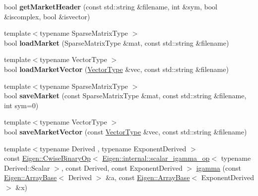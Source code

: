 \begin{DoxyCompactItemize}
\mbox{\label{namespace_eigen_a05ffc60521f5447623d7709a1419d7ac}} 
bool {\bfseries get\+Market\+Header} (const std\+::string \&filename, int \&sym, bool \&iscomplex, bool \&isvector)
\item 
\mbox{\label{namespace_eigen_a35610696b22ae58bdd51d96468956455}} 
{\footnotesize template$<$typename Sparse\+Matrix\+Type $>$ }\\bool {\bfseries load\+Market} (Sparse\+Matrix\+Type \&mat, const std\+::string \&filename)
\item 
\mbox{\label{namespace_eigen_a0b97a7af6c8af0fa0455723203b24853}} 
{\footnotesize template$<$typename Vector\+Type $>$ }\\bool {\bfseries load\+Market\+Vector} (\hyperlink{struct_vector_type}{Vector\+Type} \&vec, const std\+::string \&filename)
\item 
\mbox{\label{namespace_eigen_a33d673f7e2dfee413dec4395a6a40f46}} 
{\footnotesize template$<$typename Sparse\+Matrix\+Type $>$ }\\bool {\bfseries save\+Market} (const Sparse\+Matrix\+Type \&mat, const std\+::string \&filename, int sym=0)
\item 
\mbox{\label{namespace_eigen_a43fb1aaef616814a2c030a7986ed0afd}} 
{\footnotesize template$<$typename Vector\+Type $>$ }\\bool {\bfseries save\+Market\+Vector} (const \hyperlink{struct_vector_type}{Vector\+Type} \&vec, const std\+::string \&filename)
\item 
{\footnotesize template$<$typename Derived , typename Exponent\+Derived $>$ }\\const \hyperlink{group___core___module_class_eigen_1_1_cwise_binary_op}{Eigen\+::\+Cwise\+Binary\+Op}$<$ \hyperlink{struct_eigen_1_1internal_1_1scalar__igamma__op}{Eigen\+::internal\+::scalar\+\_\+igamma\+\_\+op}$<$ typename Derived\+::\+Scalar $>$, const Derived, const Exponent\+Derived $>$ \hyperlink{namespace_eigen_af5aa651137636b1cdbd27de1cfe91148}{igamma} (const \hyperlink{group___core___module_class_eigen_1_1_array_base}{Eigen\+::\+Array\+Base}$<$ Derived $>$ \&a, const \hyperlink{group___core___module_class_eigen_1_1_array_base}{Eigen\+::\+Array\+Base}$<$ Exponent\+Derived $>$ \&x)
\item 

\end{DoxyCompactItemize}
